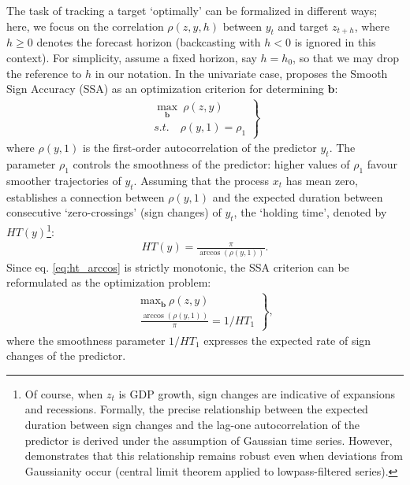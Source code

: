\documentclass[11pt,a4paper]{article}
\begin{document}
The task of tracking a target `optimally' can be formalized in different ways; here, we focus on the correlation $\rho(z,y,h)$ between $y_t$ and target $z_{t+h}$, where $h\geq 0$ denotes the forecast horizon (backcasting with $h<0$ is ignored in this context). For simplicity, assume a fixed horizon, say $h=h_0$, so that we may drop the reference to $h$ in our notation. In the univariate case, \cite{Wildi2025} proposes the Smooth Sign Accuracy (SSA) as an optimization criterion for determining $\mathbf{b}$:
\begin{eqnarray}\label{critssa}
\left.\begin{array}{c}\max_{\mathbf{b}}~\rho(z,y)\\
s.t. \quad \rho(y,1)=\rho_1\end{array}\right\}
\end{eqnarray}
where $\rho(y,1)$ is the first-order autocorrelation of the predictor $y_t$. The parameter $\rho_1$ controls the smoothness of the predictor: higher values of $\rho_1$ favour smoother trajectories of $y_t$. Assuming that the process $x_t$ has mean zero, \cite{Wildi2024} establishes a connection between $\rho(y,1)$ and the expected duration between consecutive `zero-crossings' (sign changes) of $y_t$, the `holding time', denoted by $HT(y)$\footnote{Of course, when $z_t$ is GDP growth, sign changes are indicative of expansions and recessions. Formally, the precise relationship between the expected duration between sign changes and the lag-one autocorrelation of the predictor is derived under the assumption of Gaussian time series. However, \cite{Wildi2024} demonstrates that this relationship remains robust even when deviations from Gaussianity occur (central limit theorem applied to lowpass-filtered series).}:
\begin{eqnarray}\label{ht}
HT(y)=\frac{\pi}{\arccos(\rho(y,1))}.
\label{eq:ht_arccos}
\end{eqnarray}
Since eq. \eqref{eq:ht_arccos} is strictly monotonic, the SSA criterion can be reformulated as the optimization problem:
\begin{eqnarray}\label{critssaht}
\left.\begin{array}{c}\textrm{max}_{\mathbf{b}}~\rho(z,y)\\
\frac{\arccos(\rho(y,1))}{\pi}=1/HT_1\end{array}\right\},
\end{eqnarray}
where the smoothness parameter $1/HT_1$ expresses the expected rate of sign changes of the predictor. \\
\end{document}
